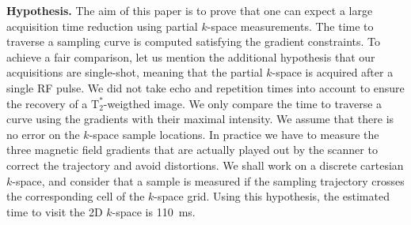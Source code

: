 \documentclass{article}
\begin{document}
\noindent\textbf{Hypothesis.}
\label{part:hypothesis}
The aim of this paper is to prove that one can expect a large acquisition time reduction using partial $k$-space measurements. The time to traverse a sampling curve is computed satisfying the gradient constraints. To achieve a fair comparison, let us mention the additional hypothesis that our acquisitions are single-shot, meaning that the partial $k$-space is acquired after a single RF pulse. We did not take echo and repetition times into account to ensure the recovery of a $\text{T}^*_2$-weigthed image. We only compare the time to traverse a curve using the gradients with their maximal intensity. We assume that there is no error on the $k$-space sample locations. In practice we have to measure the three magnetic field gradients that are actually played out by the scanner to correct the trajectory and avoid distortions.
We shall work on a discrete cartesian $k$-space, and consider that a sample is measured if the sampling trajectory crosses the corresponding cell of the $k$-space grid. 
Using this hypothesis, the estimated time to visit the 2D $k$-space is 110~ms.
\end{document}
